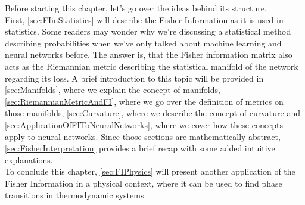 Before starting this chapter, let's go over the ideas behind its structure.\\
First, \cref{sec:FIinStatistics} will describe the Fisher Information as it is used in statistics. Some readers may wonder why we're discussing a statistical method describing probabilities when we've only talked about machine learning and neural networks before. The answer is, that the Fisher information matrix also
acts as the Riemannian metric describing the statistical manifold of the network regarding its loss. A brief introduction to this topic will be provided in \cref{sec:Manifolds}, where we explain the concept of manifolds, \cref{sec:RiemannianMetricAndFI}, where we go over the definition of metrics on those manifolds, \cref{sec:Curvature}, where we describe the concept of curvature and \cref{sec:ApplicationOfFIToNeuralNetworks}, where we cover how these concepts apply to neural networks. Since those sections are mathematically abstract, \cref{sec:FisherInterpretation} provides a brief recap with some added intuitive explanations.\\
To conclude this chapter, \cref{sec:FIPhysics} will present another application of the Fisher Information in a physical context, where it can be used to find phase transitions in thermodynamic systems.